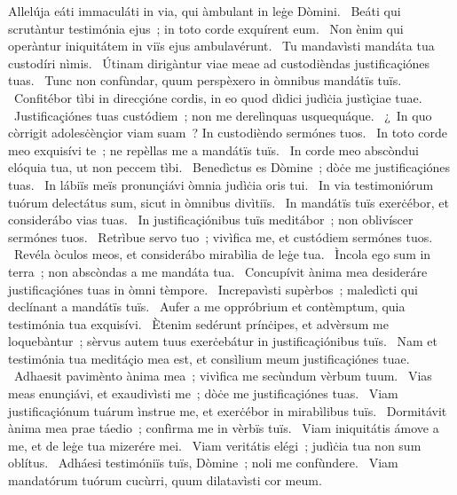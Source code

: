 { Allelúja}
{%
eáti immaculáti in via, qui àmbulant in leġe Dòmini.
~Beáti qui scrutàntur testimónia ejus~; in toto corde exquírent eum.
~Non ènim qui operàntur iniquitátem in viïs ejus ambulavérunt.
~Tu mandavìsti mandáta tua custodíri nìmis.
~Útinam dirigàntur viae meae ad custodièndas justificaçiónes tuas.
~Tunc non confùndar, quum perspèxero in òmnibus mandátïs tuïs.
~Confitébor tìbi in direcçióne cordis, in eo quod dìdici judìċia justìçiae tuae.
~Justificaçiónes tuas custódiem~; non me derelìnquas usquequáque.
~¿~In quo còrrigit adolesċènçior viam suam~? In custodièndo sermónes tuos.
~In toto corde meo exquisívi te~; ne repèllas me a mandátïs tuïs.
~In corde meo abscòndui elóquia tua, ut non peccem tìbi.
~Benedìctus es Dòmine~; dòċe me justificaçiónes tuas.
~In lábiïs meïs pronunçiávi òmnia judìċia oris tui.
~In via testimoniórum tuórum delectátus sum, sicut in òmnibus divìtiïs.
~In mandátïs tuïs exerċébor, et considerábo vias tuas.
~In justificaçiónibus tuïs meditábor~; non oblivíscer sermónes tuos.
~Retrìbue servo tuo~; vivìfica me, et custódiem sermónes tuos.
~Revéla òculos meos, et considerábo mirabìlia de leġe tua.
~Ìncola ego sum in terra~; non abscòndas a me mandáta tua.
~Concupívit ànima mea desideráre justificaçiónes tuas in òmni tèmpore.
~Increpavìsti supèrbos~; maledìcti qui declínant a mandátïs tuïs.
~Aufer a me oppróbrium et contèmptum, quia testimónia tua exquisívi.
~Ètenim sedérunt prínċipes, et advèrsum me loquebàntur~; sèrvus autem tuus exerċebátur in justificaçiónibus tuïs.
~Nam et testimónia tua meditáçio mea est, et consìlium meum justificaçiónes tuae.
~Adhaesit pavimènto ànima mea~; vivìfica me secùndum vèrbum tuum.
~Vias meas enunçiávi, et exaudivìsti me~; dòċe me justificaçiónes tuas.
~Viam justificaçiónum tuárum ìnstrue me, et exerċébor in mirabìlibus tuïs.
~Dormitávit ànima mea prae táedio~; confìrma me in vèrbïs tuïs.
~Viam iniquitátis ámove a me, et de leġe tua mizerére mei.
~Viam veritátis elégi~; judìċia tua non sum oblítus.
~Adháesi testimóniïs tuïs, Dòmine~; noli me confùndere.
~Viam mandatórum tuórum cucùrri, quum dilatavìsti cor meum.
}
